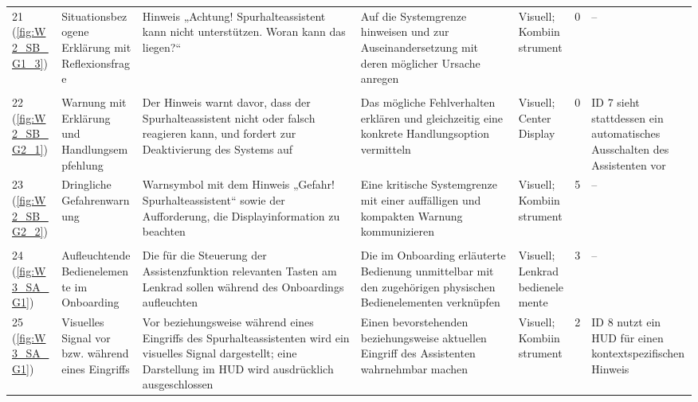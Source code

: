 {\begin{xltabular}{\textwidth}{
    P{0.65cm}
    Y
    Y
    Y
    P{1.75cm}
    P{1.25cm}
    Y
}
21 (\ref{fig:W2_SB_G1_3}) &
Situationsbezogene Erklärung mit Reflexionsfrage &
Hinweis „Achtung! Spurhalteassistent kann nicht unterstützen. Woran kann das liegen?“ &
Auf die Systemgrenze hinweisen und zur Auseinandersetzung mit deren möglicher Ursache anregen &
Visuell; Kombiinstrument &
0 &
--
\\

\rowrule
{}
\\
\rowrule

22 (\ref{fig:W2_SB_G2_1}) &
Warnung mit Erklärung und Handlungsempfehlung &
Der Hinweis warnt davor, dass der Spurhalteassistent nicht oder falsch reagieren kann, und fordert zur Deaktivierung des Systems auf &
Das mögliche Fehlverhalten erklären und gleichzeitig eine konkrete Handlungsoption vermitteln &
Visuell; Center Display &
0 &
ID 7 sieht stattdessen ein automatisches Ausschalten des Assistenten vor
\\

\rowrule

23 (\ref{fig:W2_SB_G2_2}) &
Dringliche Gefahrenwarnung &
Warnsymbol mit dem Hinweis „Gefahr! Spurhalteassistent“ sowie der Aufforderung, die Displayinformation zu beachten &
Eine kritische Systemgrenze mit einer auffälligen und kompakten Warnung kommunizieren &
Visuell; Kombiinstrument &
5 &
--
\\

\rowrule
{}
\\
\rowrule

24 (\ref{fig:W3_SA_G1}) &
Aufleuchtende Bedienelemente im Onboarding &
Die für die Steuerung der Assistenzfunktion relevanten Tasten am Lenkrad sollen während des Onboardings aufleuchten &
Die im Onboarding erläuterte Bedienung unmittelbar mit den zugehörigen physischen Bedienelementen verknüpfen &
Visuell; Lenkradbedienelemente &
3 &
--
\\

\rowrule

25 (\ref{fig:W3_SA_G1}) &
Visuelles Signal vor bzw. während eines Eingriffs &
Vor beziehungsweise während eines Eingriffs des Spurhalteassistenten wird ein visuelles Signal dargestellt; eine Darstellung im HUD wird ausdrücklich ausgeschlossen &
Einen bevorstehenden beziehungsweise aktuellen Eingriff des Assistenten wahrnehmbar machen &
Visuell; Kombiinstrument &
2 &
ID 8 nutzt ein HUD für einen kontextspezifischen Hinweis
\\


\end{xltabular}}
